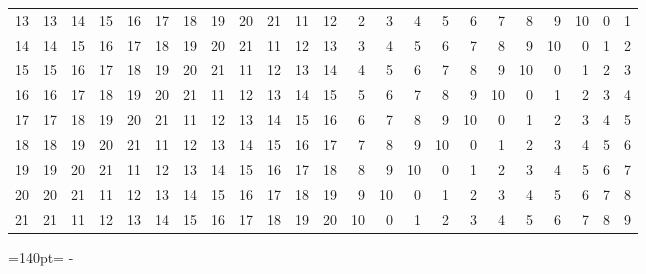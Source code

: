 \documentclass[10pt,a4paper]{article}
\newcommand{\needspace}[1]{\par\penalty-100\begingroup\dimen0=#1\relax\dimen2=\pagegoal
  \advance\dimen2-\pagetotal\ifdim\dimen0>\dimen2\relax\ifdim\dimen2>0pt\vfil\break\fi\fi
  \endgroup}
\numberwithin{equation}{section}
\begin{document}
{\begin{longtable}{@{}r|rrrrrrrrrrrrrrrrrrrrrr@{}}
13 & 13 & 14 & 15 & 16 & 17 & 18 & 19 & 20 & 21 & 11 & 12 & 2 & 3 & 4 & 5 & 6 & 7 & 8 & 9 & 10 & 0 & 1\\
14 & 14 & 15 & 16 & 17 & 18 & 19 & 20 & 21 & 11 & 12 & 13 & 3 & 4 & 5 & 6 & 7 & 8 & 9 & 10 & 0 & 1 & 2\\
15 & 15 & 16 & 17 & 18 & 19 & 20 & 21 & 11 & 12 & 13 & 14 & 4 & 5 & 6 & 7 & 8 & 9 & 10 & 0 & 1 & 2 & 3\\
16 & 16 & 17 & 18 & 19 & 20 & 21 & 11 & 12 & 13 & 14 & 15 & 5 & 6 & 7 & 8 & 9 & 10 & 0 & 1 & 2 & 3 & 4\\
17 & 17 & 18 & 19 & 20 & 21 & 11 & 12 & 13 & 14 & 15 & 16 & 6 & 7 & 8 & 9 & 10 & 0 & 1 & 2 & 3 & 4 & 5\\
18 & 18 & 19 & 20 & 21 & 11 & 12 & 13 & 14 & 15 & 16 & 17 & 7 & 8 & 9 & 10 & 0 & 1 & 2 & 3 & 4 & 5 & 6\\
19 & 19 & 20 & 21 & 11 & 12 & 13 & 14 & 15 & 16 & 17 & 18 & 8 & 9 & 10 & 0 & 1 & 2 & 3 & 4 & 5 & 6 & 7\\
20 & 20 & 21 & 11 & 12 & 13 & 14 & 15 & 16 & 17 & 18 & 19 & 9 & 10 & 0 & 1 & 2 & 3 & 4 & 5 & 6 & 7 & 8\\*
21 & 21 & 11 & 12 & 13 & 14 & 15 & 16 & 17 & 18 & 19 & 20 & 10 & 0 & 1 & 2 & 3 & 4 & 5 & 6 & 7 & 8 & 9\\
\bottomrule\end{longtable}}
\needspace{140pt}
\end{document}
